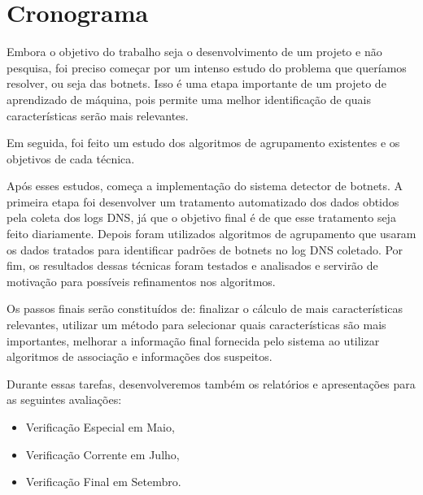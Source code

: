 \chapter{Cronograma}
Embora o objetivo do trabalho seja o desenvolvimento de um projeto e não pesquisa, foi preciso começar por um intenso estudo do problema que queríamos resolver, ou seja das botnets. Isso é uma etapa importante de um projeto de aprendizado de máquina, pois permite uma melhor identificação de quais características serão mais relevantes.

Em seguida, foi feito um estudo dos algoritmos de agrupamento existentes e os objetivos de cada técnica.

Após esses estudos, começa a implementação do sistema detector de botnets. A primeira etapa foi desenvolver um tratamento automatizado dos dados obtidos pela coleta dos logs DNS, já que o objetivo final é de que esse tratamento seja feito diariamente. Depois foram utilizados algoritmos de agrupamento que usaram os dados tratados para identificar padrões de botnets no log DNS coletado. Por fim, os resultados dessas técnicas foram testados e analisados e servirão de motivação para possíveis refinamentos nos algoritmos.

Os passos finais serão constituídos de: finalizar o cálculo de mais características relevantes, utilizar um método para selecionar quais características são mais importantes, melhorar a informação final fornecida pelo sistema ao utilizar algoritmos de associação e informações dos suspeitos.

Durante essas tarefas, desenvolveremos também os relatórios e apresentações para as seguintes avaliações:

\begin{itemize}  
\item Verificação Especial em Maio,
\item Verificação Corrente em Julho,
\item Verificação Final em Setembro.
\end{itemize}

